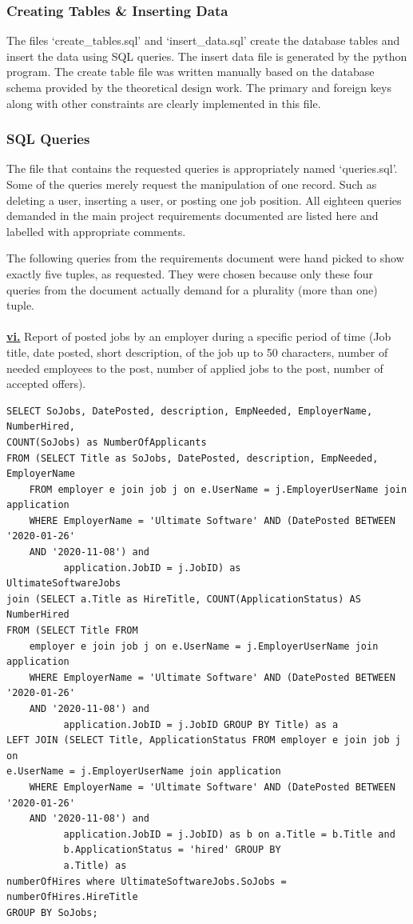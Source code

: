 \documentclass[11pt]{article}
\begin{document}
\subsubsection{Creating Tables \& Inserting Data}
The files `create\_tables.sql' and `insert\_data.sql' create the database tables and insert the data using SQL queries. The insert data file is generated by the python program. The create table file was written manually based on the database schema provided by the theoretical design work. The primary and foreign keys along with other constraints are clearly implemented in this file.


\subsubsection{SQL Queries}

The file that contains the requested queries is appropriately named `queries.sql'. Some of the queries merely request the manipulation of one record. Such as deleting a user, inserting a user, or posting one job position. All eighteen queries demanded in the main project requirements documented are listed here and labelled with appropriate comments. \par 
The following queries from the requirements document were hand picked to show exactly five tuples, as requested. They were chosen because only these four queries from the document actually demand for a plurality (more than one) tuple. \\
\\
\underline{\textbf{vi.}} Report of posted jobs by an employer during a specific period of time (Job title, date posted, short description, of the job up to 50 characters, number of needed employees to the post, number of applied jobs to the post, number of accepted offers). \\

\begin{verbatim}
SELECT SoJobs, DatePosted, description, EmpNeeded, EmployerName, NumberHired, 
COUNT(SoJobs) as NumberOfApplicants
FROM (SELECT Title as SoJobs, DatePosted, description, EmpNeeded, EmployerName
    FROM employer e join job j on e.UserName = j.EmployerUserName join application
    WHERE EmployerName = 'Ultimate Software' AND (DatePosted BETWEEN '2020-01-26' 
    AND '2020-11-08') and
          application.JobID = j.JobID) as
UltimateSoftwareJobs
join (SELECT a.Title as HireTitle, COUNT(ApplicationStatus) AS NumberHired
FROM (SELECT Title FROM
    employer e join job j on e.UserName = j.EmployerUserName join application
    WHERE EmployerName = 'Ultimate Software' AND (DatePosted BETWEEN '2020-01-26' 
    AND '2020-11-08') and
          application.JobID = j.JobID GROUP BY Title) as a
LEFT JOIN (SELECT Title, ApplicationStatus FROM employer e join job j on 
e.UserName = j.EmployerUserName join application
    WHERE EmployerName = 'Ultimate Software' AND (DatePosted BETWEEN '2020-01-26'
    AND '2020-11-08') and
          application.JobID = j.JobID) as b on a.Title = b.Title and 
          b.ApplicationStatus = 'hired' GROUP BY
          a.Title) as
numberOfHires where UltimateSoftwareJobs.SoJobs = numberOfHires.HireTitle
GROUP BY SoJobs;
\end{verbatim}
\end{document}
